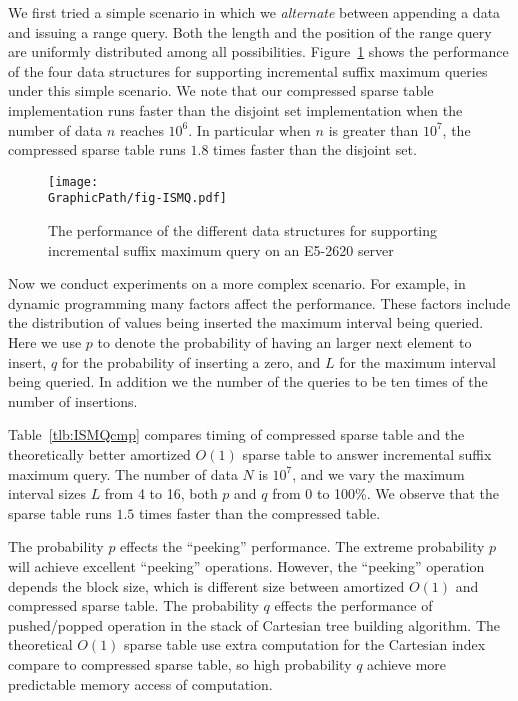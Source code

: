 We first tried a simple scenario in which we {\em alternate} between
appending a data and issuing a range query.  Both the length and the
position of the range query are uniformly distributed among all
possibilities.  Figure~\ref{fig:fig-ISMQcmp} shows the performance of
the four data structures for supporting incremental suffix maximum
queries under this simple scenario.  We note that our compressed
sparse table implementation runs faster than the disjoint set
implementation when the number of data $n$ reaches $10^6$.  In
particular when $n$ is greater than $10^7$, the compressed sparse
table runs $1.8$ times faster than the disjoint set.

\begin{figure}[!thb]
  \centering
  \texttt{[image: \\GraphicPath/fig-ISMQ.pdf]}
  \caption{The performance of the different data structures for
    supporting incremental suffix maximum query on an E5-2620 server}
  \label{fig:fig-ISMQcmp}
\end{figure}

Now we conduct experiments on a more complex scenario.  For example, in
dynamic programming many factors affect the performance. These factors
include the distribution of values being inserted the maximum interval
being queried.  Here we use $p$ to denote the probability of having an
larger next element to insert, $q$ for the probability of inserting a
zero, and $L$ for the maximum interval being queried.  In addition we
the number of the queries to be ten times of the number of insertions.

Table~\ref{tlb:ISMQcmp} compares timing of compressed sparse table and
the theoretically better amortized $O(1)$ sparse table to answer
incremental suffix maximum query.  The number of data $N$ is $10^7$, and
we vary the maximum interval sizes $L$ from 4 to 16, both $p$ and $q$
from 0 to 100\%.  We observe that the sparse table runs $1.5$ times
faster than the compressed table.



The probability $p$ effects the ``peeking'' performance.  The extreme
probability $p$ will achieve excellent ``peeking'' operations.  However,
the ``peeking'' operation depends the block size, which is different
size between amortized $O(1)$ and compressed sparse table.  The
probability $q$ effects the performance of pushed/popped operation in
the stack of Cartesian tree building algorithm.  The theoretical $O(1)$
sparse table use extra computation for the Cartesian index compare to
compressed sparse table, so high probability $q$ achieve more
predictable memory access of computation.

